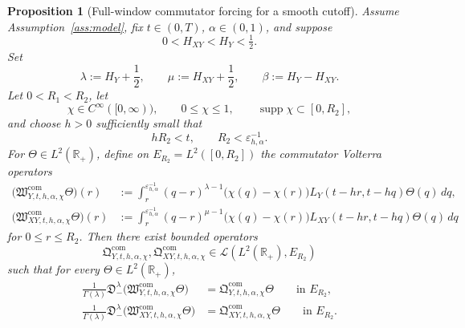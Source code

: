 \documentclass[11pt,a4paper]{amsart}
\theoremstyle{plain}
\newtheorem{proposition}[theorem]{Proposition}
\theoremstyle{definition}
\theoremstyle{remark}
\newcommand{\R}{\mathbb{R}}
\begin{document}
\begin{proposition}[Full-window commutator forcing for a smooth cutoff]
\label{prop:micro-smooth-commutator}
Assume Assumption~\ref{ass:model}, fix \(t\in(0,T)\), \(\alpha\in(0,1)\), and suppose
\[
0<H_{XY}<H_Y<\tfrac12.
\]
Set
\[
\lambda:=H_Y+\frac12,
\qquad
\mu:=H_{XY}+\frac12,
\qquad
\beta:=H_Y-H_{XY}.
\]
Let \(0<R_1<R_2\), let
\[
\chi\in C^\infty([0,\infty)),
\qquad
0\le\chi\le1,
\qquad
\operatorname{supp}\chi\subset[0,R_2],
\]
and choose
\(h>0\) sufficiently small that
\[
hR_2<t,
\qquad
R_2<\varepsilon_{h,\alpha}^{-1}.
\]
For \(\Theta\in L^2(\R_+)\), define on \(E_{R_2}=L^2([0,R_2])\) the commutator Volterra operators
\begin{align}
\bigl(
\mathfrak W_{Y,t,h,\alpha,\chi}^{\mathrm{com}}\Theta
\bigr)(r)
&:=
\int_r^{\varepsilon_{h,\alpha}^{-1}}
(q-r)^{\lambda-1}
\bigl(\chi(q)-\chi(r)\bigr)
L_Y(t-hr,t-hq)\Theta(q)\,dq,
\label{eq:micro-smooth-com-Y}\\
\bigl(
\mathfrak W_{XY,t,h,\alpha,\chi}^{\mathrm{com}}\Theta
\bigr)(r)
&:=
\int_r^{\varepsilon_{h,\alpha}^{-1}}
(q-r)^{\mu-1}
\bigl(\chi(q)-\chi(r)\bigr)
L_{XY}(t-hr,t-hq)\Theta(q)\,dq
\label{eq:micro-smooth-com-XY}
\end{align}
for \(0\le r\le R_2\). Then there exist bounded operators
\[
\mathfrak Q_{Y,t,h,\alpha,\chi}^{\mathrm{com}},
\mathfrak Q_{XY,t,h,\alpha,\chi}^{\mathrm{com}}
\in \mathcal L(L^2(\R_+),E_{R_2})
\]
such that for every \(\Theta\in L^2(\R_+)\),
\begin{align}
\frac{1}{\Gamma(\lambda)}
\mathfrak D_-^\lambda
\bigl(
\mathfrak W_{Y,t,h,\alpha,\chi}^{\mathrm{com}}\Theta
\bigr)
&=
\mathfrak Q_{Y,t,h,\alpha,\chi}^{\mathrm{com}}\Theta
\qquad\text{in }E_{R_2},
\label{eq:micro-smooth-com-conj-Y}\\
\frac{1}{\Gamma(\lambda)}
\mathfrak D_-^\lambda
\bigl(
\mathfrak W_{XY,t,h,\alpha,\chi}^{\mathrm{com}}\Theta
\bigr)
&=
\mathfrak Q_{XY,t,h,\alpha,\chi}^{\mathrm{com}}\Theta
\qquad\text{in }E_{R_2}.
\label{eq:micro-smooth-com-conj-XY}
\end{align}
\end{proposition}
\end{document}
